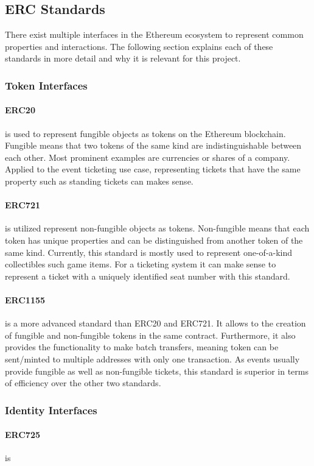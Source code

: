 \subsection{ERC Standards}

There exist multiple interfaces in the Ethereum ecosystem to represent common properties and interactions. The following section explains each of these standards in more detail and why it is relevant for this project.

\subsubsection{Token Interfaces}\label{subsubsection:token-interfaces}


\paragraph{ERC20} is used to represent fungible objects as tokens on the Ethereum blockchain. Fungible means that two tokens of the same kind are indistinguishable between each other. Most prominent examples are currencies or shares of a company. Applied to the event ticketing use case, representing tickets that have the same property such as standing tickets can makes sense.

\paragraph{ERC721} is utilized represent non-fungible objects as tokens. Non-fungible means that each token has unique properties and can be distinguished from another token of the same kind. Currently, this standard is mostly used to represent one-of-a-kind collectibles such game items. For a ticketing system it can make sense to represent a ticket with a uniquely identified seat number with this standard. 

\paragraph{ERC1155} is a more advanced standard than ERC20 and ERC721. It allows to the creation of fungible and non-fungible tokens in the same contract. Furthermore, it also provides the functionality to make batch transfers, meaning token can be sent/minted to multiple addresses with only one transaction. As events usually provide fungible as well as non-fungible tickets, this standard is superior in terms of efficiency over the other two standards.

\subsubsection{Identity Interfaces}

\paragraph{ERC725} is
